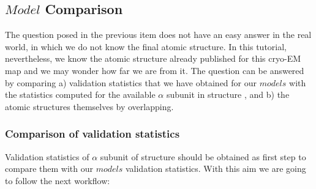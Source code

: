  \subsection*{$Model$ Comparison}
 
 The question posed in the previous item does not have an easy answer in the real world, in which we do not know the final atomic structure. In this tutorial, nevertheless, we know the atomic structure already published for this cryo-EM map and we may wonder how far we are from it. The question can be answered by comparing a) validation statistics that we have obtained for our $models$ with the statistics computed for the available $\alpha$ subunit in  structure , and b) the atomic structures themselves by overlapping.
    
  \subsubsection*{Comparison of validation statistics}
  
  Validation statistics of  $\alpha$ subunit of  structure  should be obtained as first step to compare them with our $models$ validation statistics. With this aim we are going to follow the next workflow:
  
